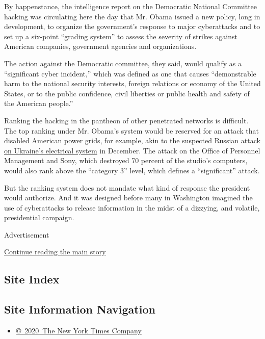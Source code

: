 By happenstance, the intelligence report on the Democratic National
Committee hacking was circulating here the day that Mr. Obama issued a
new policy, long in development, to organize the government's response
to major cyberattacks and to set up a six-point ``grading system'' to
assess the severity of strikes against American companies, government
agencies and organizations.

The action against the Democratic committee, they said, would qualify as
a ``significant cyber incident,'' which was defined as one that causes
``demonstrable harm to the national security interests, foreign
relations or economy of the United States, or to the public confidence,
civil liberties or public health and safety of the American people.''

Ranking the hacking in the pantheon of other penetrated networks is
difficult. The top ranking under Mr. Obama's system would be reserved
for an attack that disabled American power grids, for example, akin to
the suspected Russian attack
\href{http://www.nytimes.com/2016/03/01/us/politics/utilities-cautioned-about-potential-for-a-cyberattack-after-ukraines.html}{on
Ukraine's electrical system} in December. The attack on the Office of
Personnel Management and Sony, which destroyed 70 percent of the
studio's computers, would also rank above the ``category 3'' level,
which defines a ``significant'' attack.

But the ranking system does not mandate what kind of response the
president would authorize. And it was designed before many in Washington
imagined the use of cyberattacks to release information in the midst of
a dizzying, and volatile, presidential campaign.

Advertisement

\protect\hyperlink{after-bottom}{Continue reading the main story}

\hypertarget{site-index}{%
\subsection{Site Index}\label{site-index}}

\hypertarget{site-information-navigation}{%
\subsection{Site Information
Navigation}\label{site-information-navigation}}

\begin{itemize}
\tightlist
\item
  \href{https://help.nytimes.com/hc/en-us/articles/115014792127-Copyright-notice}{©~2020~The
  New York Times Company}
\end{itemize}

